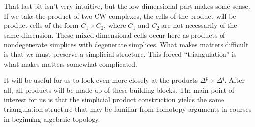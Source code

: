 \documentclass[12pt]{article}
\theoremstyle{plain}
\theoremstyle{definition}
\begin{document}
\smallskip

That last bit isn't very intuitive, but the low-dimensional part makes some sense. If we take the product of two CW complexes, the cells of the product will be product  cells of the form $C_1\times C_2$, where $C_1 $ and $C_2$ are not necessarily of the same dimension. These mixed dimensional cells occur here as products of nondegenerate simplices with degenerate simplices. What makes matters difficult is that we must preserve a simplicial structure. This forced ``triangulation'' is what makes matters somewhat complicated. 


It will be useful for us to look even more closely at the products $\Delta^p\times \Delta^q$. After all, all products will be made up of these building blocks. The main point of interest for us is that the simplicial product construction yields the same triangulation structure that may be familiar from homotopy arguments in courses in beginning algebraic topology. 
\end{document}
